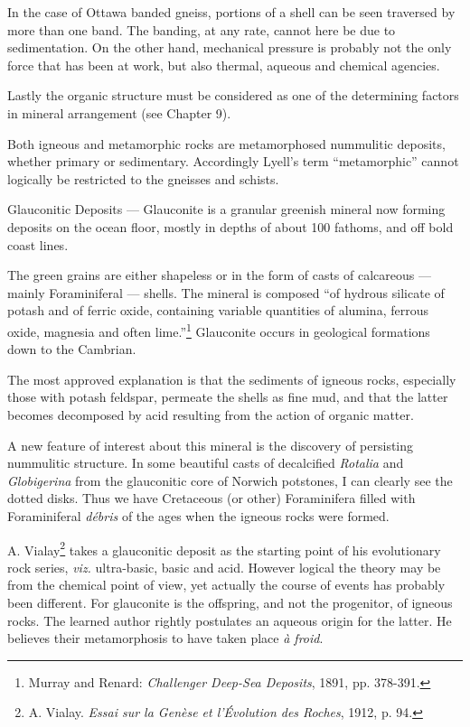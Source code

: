 \documentclass[a4paper, 12pt, oneside, landscape]{article}
\begin{document}
In the case of Ottawa banded gneiss, portions of a shell can be seen traversed by more than one band. The banding, at any rate, cannot here be due to sedimentation. On the other hand, mechanical pressure is probably not the only force that has been at work, but also thermal, aqueous and chemical agencies.

Lastly the organic structure must be considered as one of the determining factors in mineral arrangement (see Chapter 9).

Both igneous and metamorphic rocks are metamorphosed nummulitic deposits, whether primary or sedimentary. Accordingly Lyell's term ``metamorphic'' cannot logically be restricted to the gneisses and schists.

Glauconitic Deposits --- Glauconite is a granular greenish mineral now forming deposits on the ocean floor, mostly in depths of about 100 fathoms, and off bold coast lines.

The green grains are either shapeless or in the form of casts of calcareous --- mainly Foraminiferal --- shells. The mineral is composed ``of hydrous silicate of potash and of ferric oxide, containing variable quantities of alumina, ferrous oxide, magnesia and often lime.''\footnote{Murray and Renard: \emph{Challenger Deep-Sea Deposits}, 1891, pp. 378-391.} Glauconite occurs in geological formations down to the Cambrian.

The most approved explanation is that the sediments of igneous rocks, especially those with potash feldspar, permeate the shells as fine mud, and that the latter becomes decomposed by acid resulting from the action of organic matter.

A new feature of interest about this mineral is the discovery of persisting nummulitic structure. In some beautiful casts of decalcified \emph{Rotalia} and \emph{Globigerina} from the glauconitic core of Norwich potstones, I can clearly see the dotted disks. Thus we have Cretaceous (or other) Foraminifera filled with Foraminiferal \emph{débris} of the ages when the igneous rocks were formed.

A. Vialay\footnote{A. Vialay. \emph{Essai sur la Genèse et l'Évolution des Roches}, 1912, p. 94.} takes a glauconitic deposit as the starting point of his evolutionary rock series, \emph{viz.} ultra-basic, basic and acid. However logical the theory may be from the chemical point of view, yet actually the course of events has probably been different. For glauconite is the offspring, and not the progenitor, of igneous rocks. The learned author rightly postulates an aqueous origin for the latter. He believes their metamorphosis to have taken place \emph{à froid}.
\end{document}
